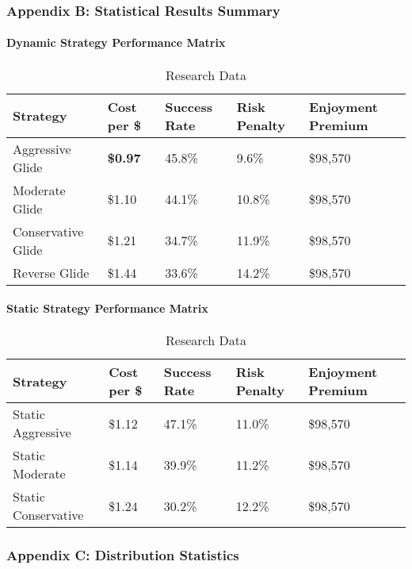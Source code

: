 \documentclass[11pt,letterpaper]{article}
\begin{document}
\subsubsection{Appendix B: Statistical Results Summary}

\paragraph{Dynamic Strategy Performance Matrix}

\begin{table}[H]
\centering
\begin{tabular}{@{}lllll@{}}
\toprule
\textbf{Strategy} & \textbf{Cost per \$} & \textbf{Success Rate} & \textbf{Risk Penalty} & \textbf{Enjoyment Premium} \\
\midrule
Aggressive Glide & \textbf{\$0.97} & 45.8\% & 9.6\% & \$98,570 \\
Moderate Glide & \$1.10 & 44.1\% & 10.8\% & \$98,570 \\
Conservative Glide & \$1.21 & 34.7\% & 11.9\% & \$98,570 \\
Reverse Glide & \$1.44 & 33.6\% & 14.2\% & \$98,570 \\
\bottomrule
\end{tabular}
\caption{Research Data}
\end{table}


\paragraph{Static Strategy Performance Matrix}

\begin{table}[H]
\centering
\begin{tabular}{@{}lllll@{}}
\toprule
\textbf{Strategy} & \textbf{Cost per \$} & \textbf{Success Rate} & \textbf{Risk Penalty} & \textbf{Enjoyment Premium} \\
\midrule
Static Aggressive & \$1.12 & 47.1\% & 11.0\% & \$98,570 \\
Static Moderate & \$1.14 & 39.9\% & 11.2\% & \$98,570 \\
Static Conservative & \$1.24 & 30.2\% & 12.2\% & \$98,570 \\
\bottomrule
\end{tabular}
\caption{Research Data}
\end{table}


\subsubsection{Appendix C: Distribution Statistics}
\end{document}
